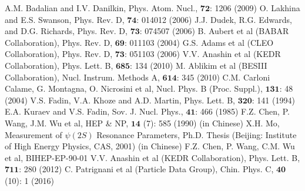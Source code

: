 \documentclass[a4paper,10pt,twoside]{cpc-hepnp}
\begin{document}
\begin{CJK*}{UTF8}{gbsn}
\begin{small}
\begin{multicols}{2}
	\end{multicols}
	
\end{small}


%

\begin{multicols}{2}
	\begin{thebibliography}{90}
		\vspace{3mm}
		A.M. Badalian and I.V. Danilkin, Phys. Atom. Nucl., $\bm{72}$: 1206 (2009)
		O. Lakhina and E.S. Swanson, Phys. Rev. D, $\bm{74}$: 014012 (2006)
		J.J. Dudek, R.G. Edwards, and D.G. Richards, Phys. Rev. D, $\bm{73}$: 074507 (2006)
		B. Aubert et al (BABAR Collaboration), Phys. Rev. D, $\bm{69}$: 011103 (2004)
		G.S. Adams et al (CLEO Collaboration), Phys. Rev. D, $\bm{73}$: 051103 (2006)
		V.V. Anashin et al (KEDR Collaboration), Phys. Lett. B, $\bm{685}$: 134 (2010)
		M. Ablikim et al (BESIII Collaboration), Nucl. Instrum. Methods A, $\bm{614}$: 345 (2010)
		C.M. Carloni Calame, G. Montagna, O. Nicrosini et al, Nucl. Phys. B (Proc. Suppl.), $\bm{131}$: 48 (2004)
		V.S. Fadin, V.A. Khoze and A.D. Martin, Phys. Lett. B, $\bm{320}$: 141 (1994)
		E.A. Kuraev and V.S. Fadin, Sov. J. Nucl. Phys., $\bm{41}$: 466 (1985)
		F.Z. Chen, P. Wang, J.M. Wu et al, HEP \& NP, $\bm{14}$ (7): 585 (1990) (in Chinese)
		X.H. Mo, Measurement of $\psi(2S)$ Resonance Parameters, Ph.D. Thesis (Beijing: Institute of High Energy Physics, CAS, 2001) (in Chinese)
		F.Z. Chen, P. Wang, C.M. Wu et al, BIHEP-EP-90-01
		V.V. Anashin et al (KEDR Collaboration), Phys. Lett. B, $\bm{711}$: 280 (2012)
		C. Patrignani et al (Particle Data Group), Chin. Phys. C, $\bm{40}$ (10): 1 (2016)
	\end{thebibliography}
\end{multicols}



\clearpage
\end{CJK*}
\end{document}
